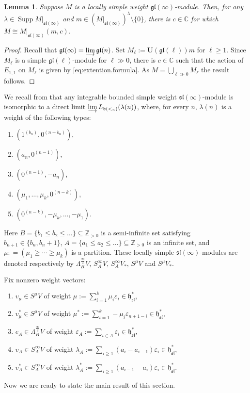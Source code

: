 \documentclass[12pt]{amsart}
\newcommand\C{\mathbb{C}}
\newcommand\Z{\mathbb{Z}}
\newcommand\fh{\mathfrak{h}}
\newcommand\fb{\mathfrak{b}}
\newcommand\fsl{\mathfrak{sl}}
\newcommand\fgl{\mathfrak{gl}}
\newcommand\bU{\mathbf{U}}
\DeclareMathOperator{\Supp}{Supp} %
\theoremstyle{plain}
\newtheorem{lem}[theo]{Lemma}
\theoremstyle{definition}
\numberwithin{equation}{section}
\begin{document}
\begin{lem}\label{lem:loc.simpl=M(c)}
Suppose $M$ is a locally simple weight $\fgl(\infty)$-module. Then, for any $\lambda\in \Supp M|_{\fsl(\infty)} $ and $m\in (M|_{\fsl(\infty)})^\lambda\setminus\{0\}$, there is $c\in \C$ for which $M\cong M|_{\fsl(\infty)} (m,c)$.
\end{lem}
\begin{proof}
Recall that $\fgl(\infty) = \varinjlim \fgl(n)$. Set $M_\ell := \bU(\fgl(\ell))m$ for $\ell\geq 1$. Since $M_\ell$ is a simple $\fgl(\ell)$-module for $\ell\gg 0$, there is $c\in \C$ such that the action of $E_{1,1}$ on $M_\ell$ is given by \eqref{eq:extention.formula}. As $M = \bigcup_{\ell \gg 0} M_\ell$ the result follows.
\end{proof}

We recall from \cite[Proposition~4.5]{GP20} that any integrable bounded simple weight $\fsl(\infty)$-module is isomorphic to a direct limit $\varinjlim L_{\fb(<_n)}(\lambda(n))$, where, for every $n$, $\lambda(n)$ is a weight of the following types:
\begin{enumerate}
\item  $(1^{(b_n)},0^{(n-b_n)})$,
\item $(a_n,0^{(n-1)})$, 
\item  $(0^{(n-1)}, -a_n)$, 
\item $(\mu_1,\ldots,\mu_k,0^{(n-k)})$, 
\item $(0^{(n-k)}, -\mu_k,\ldots,-\mu_1)$.
\end{enumerate}
Here $B = \{b_1\leq b_2\leq \ldots\} \subseteq \Z_{>0}$ is a semi-infinite set satisfying $b_{n+1}\in \{b_n, b_n+1\}$, $A=\{a_1\leq a_2\leq \ldots\} \subseteq \Z_{>0}$ is an infinite set, and $\mu : = (\mu_1\geq \cdots \geq \mu_k)$ is a partition. These locally simple $\fsl(\infty)$-modules are denoted respectively by $\Lambda_B^{\frac{\infty}{2}} V$, $S_A^\infty V$, $S_A^\infty V_*$, $S^\mu V$ and $S^\mu V_*$.

Fix nonzero weight vectors:
\begin{enumerate}
\item $v_\mu\in S^\mu V$ of weight $\mu := \sum_{i=1}^k \mu_i\varepsilon_i\in \fh_\fsl^*$,
\item $v_\mu^*\in S^\mu V$ of weight $\mu^* := \sum_{i=1}^{k}-\mu_i\varepsilon_{n+1-i} \in \fh_\fsl^*$,
\item $e_A \in \Lambda^{\frac{\infty}{2}}_B V$ of weight $\varepsilon_A := \sum_{i\in A}\varepsilon_i\in \fh_\fsl^*$,
\item $v_A \in S^\infty_A V$ of weight $\lambda_A := \sum_{i\geq 1}(a_i -a_{i-1})\varepsilon_i\in \fh_\fsl^*$,
\item $v_A^* \in S^\infty_A V$ of weight $\lambda_A^* := \sum_{i\geq 1}(a_{i-1} -a_{i})\varepsilon_i\in \fh_\fsl^*$.
\end{enumerate}
Now we are ready to state the main result of this section.
\end{document}
